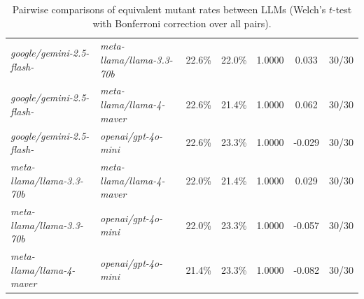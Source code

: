 \begin{table}
{\begin{tabular}{l|l|c|c|c|c|c}
\textit{google/gemini-2.5-flash-} & \textit{meta-llama/llama-3.3-70b} & 22.6\% & 22.0\% & 1.0000 & 0.033 & 30/30 \\
\textit{google/gemini-2.5-flash-} & \textit{meta-llama/llama-4-maver} & 22.6\% & 21.4\% & 1.0000 & 0.062 & 30/30 \\
\textit{google/gemini-2.5-flash-} & \textit{openai/gpt-4o-mini} & 22.6\% & 23.3\% & 1.0000 & -0.029 & 30/30 \\
\textit{meta-llama/llama-3.3-70b} & \textit{meta-llama/llama-4-maver} & 22.0\% & 21.4\% & 1.0000 & 0.029 & 30/30 \\
\textit{meta-llama/llama-3.3-70b} & \textit{openai/gpt-4o-mini} & 22.0\% & 23.3\% & 1.0000 & -0.057 & 30/30 \\
\textit{meta-llama/llama-4-maver} & \textit{openai/gpt-4o-mini} & 21.4\% & 23.3\% & 1.0000 & -0.082 & 30/30 \\
\end{tabular}
}
\caption{Pairwise comparisons of equivalent mutant rates between LLMs (Welch's $t$-test with Bonferroni correction over all pairs).}
\label{tab:llm-equiv-stats}
\end{table}